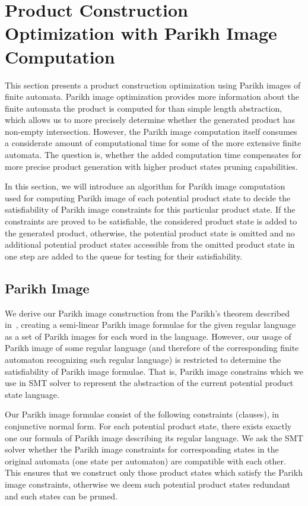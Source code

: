 \section{Product Construction Optimization with Parikh Image Computation}

This section presents a product construction optimization using Parikh images of finite automata. Parikh image optimization provides more information about the finite automata the product is computed for than simple length abstraction, which allows us to more precisely determine whether the generated product has non-empty intersection. However, the Parikh image computation itself consumes a considerate amount of computational time for some of the more extensive finite automata. The question is, whether the added computation time compensates for more precise product generation with higher product states pruning capabilities.

In this section, we will introduce an algorithm for Parikh image computation used for computing Parikh image of each potential product state to decide the satisfiability of Parikh image constraints for this particular product state. If the constraints are proved to be satisfiable, the considered product state is added to the generated product, otherwise, the potential product state is omitted and no additional potential product states accessible from the omitted product state in one step are added to the queue for testing for their satisfiability.

\subsection{Parikh Image} \label{sec:parikhImage}

We derive our Parikh image construction from the Parikh's theorem \cite{Kozen1977} described in~\cite{ParikhsTheoremSimpleAndDirectConstruction}, creating a semi-linear Parikh image formulae for the given regular language as a set of Parikh images for each word in the language. However, our usage of Parikh image of some regular language (and therefore of the corresponding finite automaton recognizing such regular language) is restricted to determine the satisfiability of Parikh image formulae. That is, Parikh image constrains which we use in SMT solver to represent the abstraction of the current potential product state language.

Our Parikh image formulae consist of the following constraints (clauses), in conjunctive normal form. For each potential product state, there exists exactly one our formula of Parikh image describing its regular language. We ask the SMT solver whether the Parikh image constraints for corresponding states in the original automata (one state per automaton) are compatible with each other. This ensures that we construct only those product states which satisfy the Parikh image constraints, otherwise we deem such potential product states redundant and such states can be pruned.

